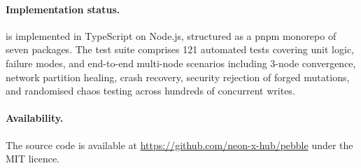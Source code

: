 \paragraph{Implementation status.}
\pebble{} is implemented in TypeScript on Node.js, structured as a pnpm
monorepo of seven packages. The test suite comprises 121 automated tests
covering unit logic, failure modes, and end-to-end multi-node scenarios
including 3-node convergence, network partition healing, crash recovery,
security rejection of forged mutations, and randomised chaos testing across
hundreds of concurrent writes.

\paragraph{Availability.}
The source code is available at
\url{https://github.com/neon-x-hub/pebble} under the MIT licence.

